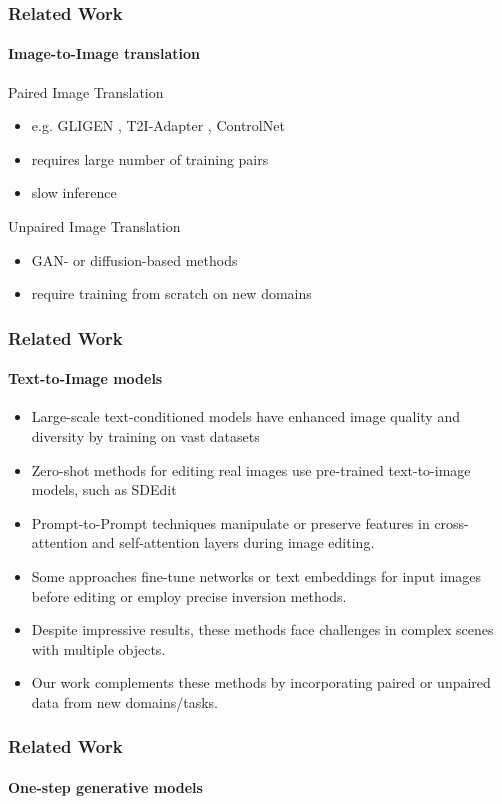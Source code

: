 \documentclass[aspectratio=169, lecture, amberg]{OTHAWbeamer}
\begin{document}
\begin{frame}
\frametitle{Related Work}
\framesubtitle{Image-to-Image translation}
Paired Image Translation
\begin{itemize}
    \item e.g. GLIGEN \cite{li2023gligen}, T2I-Adapter \cite{mou2023t2i}, ControlNet \cite{zhang2023adding}
    \item requires large number of training pairs
    \item slow inference
\end{itemize}
Unpaired Image Translation
\begin{itemize}
    \item GAN- or diffusion-based methods \cite{cyclediffusion} \cite{su2022dual} \cite{sasaki2021unitddpm}
    \item require training from scratch on new domains   
\end{itemize}
\end{frame}

\begin{frame}
\frametitle{Related Work}
\framesubtitle{Text-to-Image models}
\begin{itemize}
    \item Large-scale text-conditioned models have enhanced image quality and diversity by training on vast datasets \cite{schuhmann2022laion5b} \cite{kakaobrain2022coyo-700m}
    \item Zero-shot methods for editing real images use pre-trained text-to-image models, such as SDEdit \cite{meng2022sdedit}
    \item Prompt-to-Prompt techniques manipulate or preserve features in cross-attention and self-attention layers during image editing.
    \item Some approaches fine-tune networks or text embeddings for input images before editing or employ precise inversion methods.
    \item Despite impressive results, these methods face challenges in complex scenes with multiple objects.
    \item Our work complements these methods by incorporating paired or unpaired data from new domains/tasks.    
\end{itemize}
\end{frame}

\begin{frame}
\frametitle{Related Work}
\framesubtitle{One-step generative models}

\end{frame}
\end{document}
